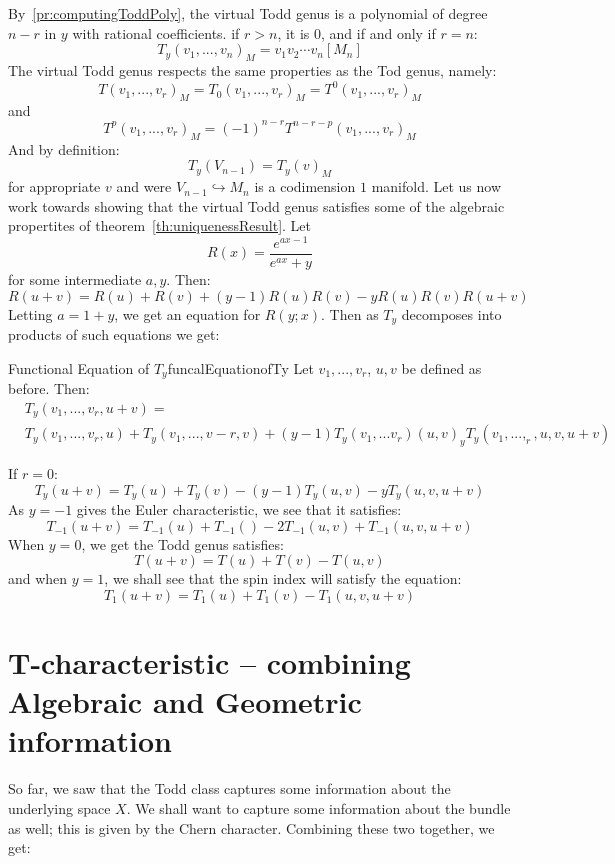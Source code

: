\documentclass{book}
\begin{document}
By~\cref{pr:computingToddPoly}, the virtual Todd genus is a polynomial of degree $n-r$ in $y$ with rational
coefficients. if $r > n$, it is $0$, and if and only if $r = n$:
\[
  T_y(v_1, ..., v_n)_M = v_1v_2\cdots v_n[M_n]
\]
The virtual Todd genus respects the same properties as the Tod genus, namely:
\[
  T(v_1, ..., v_r)_M = T_0(v_1, ..., v_r)_M = T^0(v_1, ..., v_r)_M
\]
and
\[
  T^p(v_1, ..., v_r)_M = (-1)^{n-r} T^{n-r-p}(v_1, ..., v_r)_M
\]
And by definition:
\[
  T_y(V_{n-1}) = T_y(v)_M
\]
for appropriate $v$ and were $V_{n-1} \hookrightarrow M_n$ is a codimension $1$ manifold. Let us now work
towards showing that the virtual Todd genus satisfies some of the algebraic propertites of
theorem~\cref{th:uniquenessResult}. Let
\[
R(x) = \frac{e^{ax-1}}{e^{ax}+y}
\]
for some intermediate $a,y$. Then:
\[
  R(u+v) = R(u) + R(v) + (y-1)R(u)R(v) - yR(u)R(v)R(u+v)
\]
Letting $a = 1+y$, we get an equation for $R(y;x)$. Then as $T_y$ decomposes into products of such equations
we get:

\begin{thm}{Functional Equation of $T_y$}{funcalEquationofTy}
  Let $v_1, ..., v_r$, $u,v$ be defined as before. Then:
  \begin{align*}
    &T_y(v_1, ..., v_r, u+v) =\\
    &T_y(v_1, ..., v_r, u) + T_y(v_1, ..., v-r, v) + (y-1)T_y(v_1,. .. v_r)(u,v)
    _ yT_y(v_1, ..., _r, u,v,u+v)
  \end{align*}
\end{thm}

If $r = 0$:
\[
  T_y(u+v)  =T_y(u) + T_y(v) - (y-1)T_y(u,v) - yT_y(u,v,u+v)
\]
As $y=-1$ gives the Euler characteristic, we see that it satisfies:
\[
  T_{-1}(u+v) = T_{-1}(u) + T_{-1}() - 2T_{-1}(u,v) + T_{-1}(u,v,u+v)
\]
When $y  =0$, we get the Todd genus satisfies:
\[
  T(u+v)  =T(u) + T(v) - T(u,v)
\]
and when $y=1$, we shall see that the spin index will satisfy the equation:
\[
  T_1(u+v) = T_1(u) + T_1(v) - T_1(u,v,u+v)
\]

\section{T-characteristic -- combining Algebraic and Geometric information}\label{sec:T-Char}

So far, we saw that the Todd class captures some information about the underlying space $X$. We shall want
to capture some information about the bundle as well; this is given by the Chern character. Combining these
two together, we get:
\end{document}
